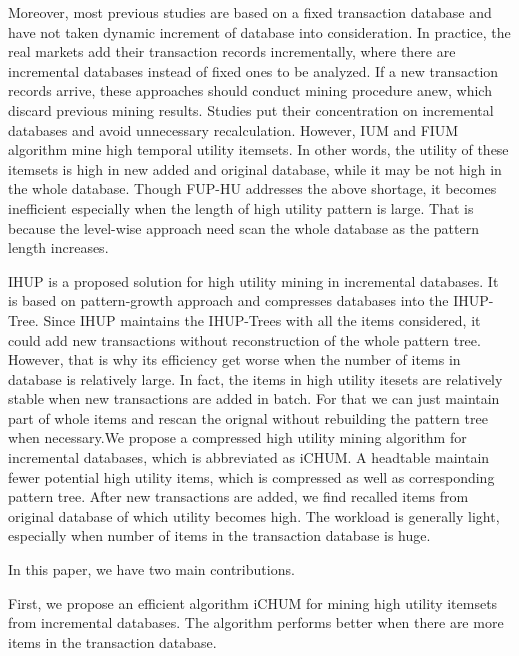 \documentclass[runningheads,a4paper]{llncs}
\begin{document}
Moreover, most previous studies \cite{Lin:for-um,Liu:two-phasewithCCPD,Liu:two-phase,Tseng:up-growth} are based on a fixed transaction database and have not taken dynamic increment of database into consideration. In practice, the real markets add their transaction records incrementally, where there are incremental databases instead of fixed ones to be analyzed. If a new transaction records arrive, these approaches should conduct mining procedure anew, which discard previous mining results. Studies \cite{Ahmed:IHUP,Lin:dynamic-databases,Lin:incremental-hui,Yeh:IUM} put their concentration on incremental databases and avoid unnecessary recalculation. However, IUM and FIUM algorithm \cite{Yeh:IUM} mine high temporal utility itemsets. In other words, the utility of these itemsets is high in new added and original database, while it may be not high in the whole database. Though FUP-HU \cite{Lin:dynamic-databases,Lin:incremental-hui} addresses the above shortage, it becomes inefficient especially when the length of high utility pattern is large. That is because the level-wise approach need scan the whole database as the pattern length increases. 

IHUP \cite{Ahmed:IHUP} is a proposed solution for high utility mining in incremental databases. It is based on pattern-growth approach and compresses databases into the IHUP-Tree. Since IHUP maintains the IHUP-Trees with all the items considered, it could add new transactions without reconstruction of the whole pattern tree. However, that is why its efficiency get worse when the number of items in database is relatively large. In fact, the items in high utility itesets are relatively stable when new transactions are added in batch. For that we can just maintain part of whole items and rescan the orignal without rebuilding the pattern tree when necessary.We propose a compressed high utility mining algorithm for incremental databases, which is abbreviated as iCHUM. A headtable maintain fewer potential high utility items, which is compressed as well as corresponding pattern tree. After new transactions are added, we find recalled items from original database of which utility becomes high. The workload is generally light, especially when number of items in the transaction database is huge.

In this paper, we have two main contributions.

First, we propose an efficient algorithm iCHUM for mining high utility itemsets from incremental databases. The algorithm performs better when there are more items in the transaction database.
\end{document}
